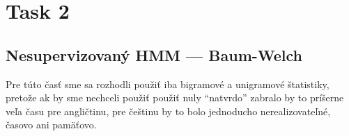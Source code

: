 \documentclass[a4paper, 10.5pt]{article}
\begin{document}
\section*{Task 2}

\subsection*{Nesupervizovaný HMM --- Baum-Welch}

Pre túto časť sme sa rozhodli použiť iba bigramové a unigramové štatistiky, pretože ak by sme nechceli použiť použiť nuly ``natvrdo'' zabralo by to príšerne veľa času pre angličtinu, pre češtinu by to bolo jednoducho nerealizovateľné, časovo ani pamäťovo.
\end{document}
